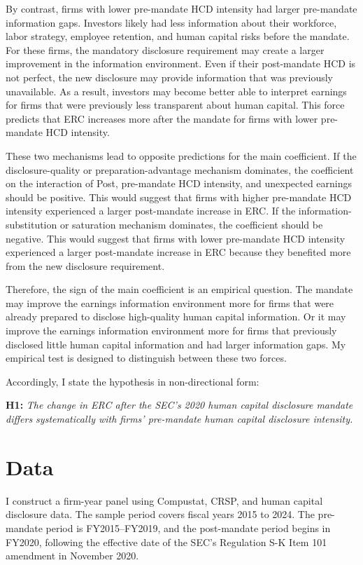 \documentclass[12pt]{article}
\begin{document}
By contrast, firms with lower pre-mandate HCD intensity had larger pre-mandate information gaps. Investors likely had less information about their workforce, labor strategy, employee retention, and human capital risks before the mandate. For these firms, the mandatory disclosure requirement may create a larger improvement in the information environment. Even if their post-mandate HCD is not perfect, the new disclosure may provide information that was previously unavailable. As a result, investors may become better able to interpret earnings for firms that were previously less transparent about human capital. This force predicts that ERC increases more after the mandate for firms with lower pre-mandate HCD intensity.

These two mechanisms lead to opposite predictions for the main coefficient. If the disclosure-quality or preparation-advantage mechanism dominates, the coefficient on the interaction of Post, pre-mandate HCD intensity, and unexpected earnings should be positive. This would suggest that firms with higher pre-mandate HCD intensity experienced a larger post-mandate increase in ERC. If the information-substitution or saturation mechanism dominates, the coefficient should be negative. This would suggest that firms with lower pre-mandate HCD intensity experienced a larger post-mandate increase in ERC because they benefited more from the new disclosure requirement.

Therefore, the sign of the main coefficient is an empirical question. The mandate may improve the earnings information environment more for firms that were already prepared to disclose high-quality human capital information. Or it may improve the earnings information environment more for firms that previously disclosed little human capital information and had larger information gaps. My empirical test is designed to distinguish between these two forces.

Accordingly, I state the hypothesis in non-directional form:

\medskip
\noindent\textbf{H1:} \textit{The change in ERC after the SEC's 2020 human capital disclosure mandate differs systematically with firms' pre-mandate human capital disclosure intensity.}
\medskip

\section{Data}

I construct a firm-year panel using Compustat, CRSP, and human capital disclosure data. The sample period covers fiscal years 2015 to 2024. The pre-mandate period is FY2015--FY2019, and the post-mandate period begins in FY2020, following the effective date of the SEC's Regulation S-K Item 101 amendment in November 2020.
\end{document}
